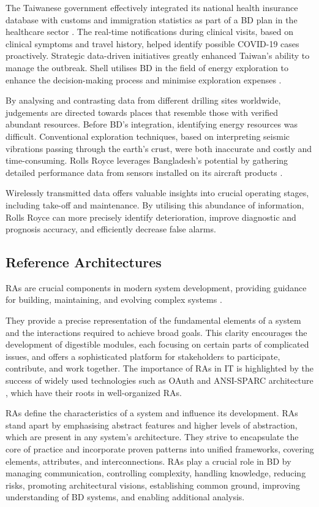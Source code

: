 \documentclass[review]{elsarticle}
\begin{document}
The Taiwanese government effectively integrated its national health insurance database with customs and immigration statistics as part of a BD plan in the healthcare sector \cite{wang2020response}. The real-time notifications during clinical visits, based on clinical symptoms and travel history, helped identify possible COVID-19 cases proactively. Strategic data-driven initiatives greatly enhanced Taiwan's ability to manage the outbreak. Shell utilises BD in the field of energy exploration to enhance the decision-making process and minimise exploration expenses \cite{Marr2016}. 

By analysing and contrasting data from different drilling sites worldwide, judgements are directed towards places that resemble those with verified abundant resources. Before BD's integration, identifying energy resources was difficult. Conventional exploration techniques, based on interpreting seismic vibrations passing through the earth's crust, were both inaccurate and costly and time-consuming. Rolls Royce leverages Bangladesh's potential by gathering detailed performance data from sensors installed on its aircraft products \cite{rad2017big}. 

Wirelessly transmitted data offers valuable insights into crucial operating stages, including take-off and maintenance. By utilising this abundance of information, Rolls Royce can more precisely identify deterioration, improve diagnostic and prognosis accuracy, and efficiently decrease false alarms. 

\subsection{Reference Architectures} 

RAs are crucial components in modern system development, providing guidance for building, maintaining, and evolving complex systems \cite{Cloutier2010}. 

They provide a precise representation of the fundamental elements of a system and the interactions required to achieve broad goals. This clarity encourages the development of digestible modules, each focusing on certain parts of complicated issues, and offers a sophisticated platform for stakeholders to participate, contribute, and work together. The importance of RAs in IT is highlighted by the success of widely used technologies such as OAuth \cite{OATH} and ANSI-SPARC architecture \cite{ANSI}, which have their roots in well-organized RAs. 

RAs define the characteristics of a system and influence its development. RAs stand apart by emphasising abstract features and higher levels of abstraction, which are present in any system's architecture. They strive to encapsulate the core of practice and incorporate proven patterns into unified frameworks, covering elements, attributes, and interconnections. RAs play a crucial role in BD by managing communication, controlling complexity, handling knowledge, reducing risks, promoting architectural visions, establishing common ground, improving understanding of BD systems, and enabling additional analysis. 
\end{document}

